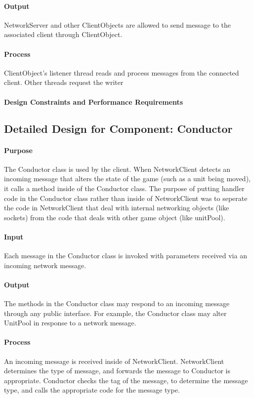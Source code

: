 \documentclass[12pt,a4paper,titlepage]{article}
\begin{document}
\paragraph{Output} NetworkServer and other ClientObjects are allowed
to send message to the associated client through ClientObject.
\paragraph{Process} ClientObject's listener thread reads and process messages from the connected client. Other threads request the writer
\paragraph{Design Constraints and Performance Requirements}

\subsection{Detailed Design for Component: Conductor}
\paragraph{Purpose} The Conductor class is used by the client. When NetworkClient detects an incoming message that alters the state of the game (such as a unit being moved), it calls a method inside of the Conductor class. The purpose of putting handler code in the Conductor class rather than inside of NetworkClient was to seperate the code in NetworkClient that deal with internal networking objects (like sockets) from the code that deals with other game object (like unitPool).
\paragraph{Input} Each message in the Conductor class is invoked with parameters received via an incoming network message.
\paragraph{Output} The methods in the Conductor class may respond to an incoming message through any public interface. For example, the Conductor class may alter UnitPool in response to a network message.
\paragraph{Process} An incoming message is received inside of NetworkClient. NetworkClient determines the type of message, and forwards the message to Conductor is appropriate. Conductor checks the tag of the message, to determine the message type, and calls the appropriate code for the message type.
\end{document}
